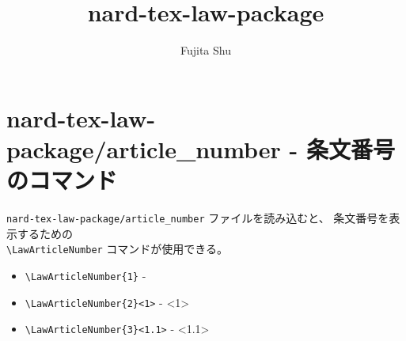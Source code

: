 \documentclass[oneside,10pt,a4paper]{jsarticle}
\title{nard-tex-law-package}
\author{Fujita Shu}
\begin{document}
  \maketitle

  \section{nard-tex-law-package/article\_number - 条文番号のコマンド}

  \verb|nard-tex-law-package/article_number| ファイルを読み込むと、
  条文番号を表示するための\\
  \verb|\LawArticleNumber| コマンドが使用できる。

  \begin{itemize}
    \item \verb|\LawArticleNumber{1}| - 
    \item \verb|\LawArticleNumber{2}<1>| - <1>
    \item \verb|\LawArticleNumber{3}<1.1>| - <1.1>
  \end{itemize}
\end{document}
